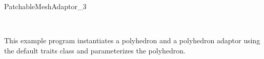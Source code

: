 \begin{ccRefConcept}{PatchableMeshAdaptor_3}
\ccHasModels

 \\

\ccSeeAlso



\ccExample

This example program instantiates a polyhedron and a polyhedron adaptor using the default
traits class and parameterizes the polyhedron.



\end{ccRefConcept}


